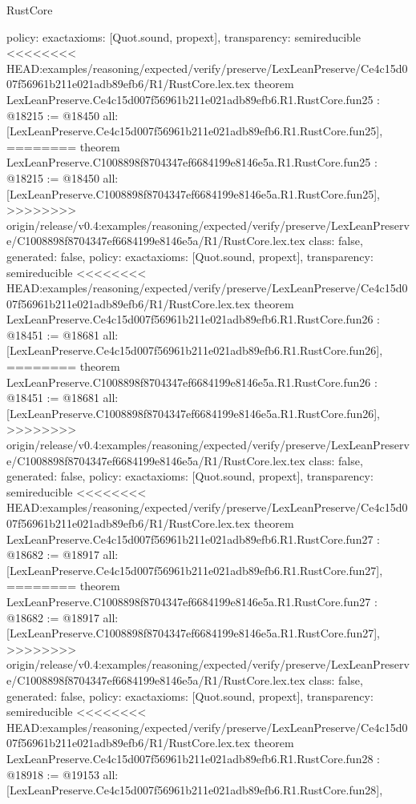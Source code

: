 \begin{lexlean}{RustCore}
\begin{coremodule}
{\begin{coremodule}
{{{{{{{{{{{{{{{{{{{{{{{{{{{{  policy: exact{axioms: [Quot.sound, propext]},
  transparency: semireducible
}
<<<<<<<< HEAD:examples/reasoning/expected/verify/preserve/LexLeanPreserve/Ce4c15d007f56961b211e021adb89efb6/R1/RustCore.lex.tex
theorem LexLeanPreserve.Ce4c15d007f56961b211e021adb89efb6.R1.RustCore.fun25 : @18215 := @18450 {
  all: [LexLeanPreserve.Ce4c15d007f56961b211e021adb89efb6.R1.RustCore.fun25],
========
theorem LexLeanPreserve.C1008898f8704347ef6684199e8146e5a.R1.RustCore.fun25 : @18215 := @18450 {
  all: [LexLeanPreserve.C1008898f8704347ef6684199e8146e5a.R1.RustCore.fun25],
>>>>>>>> origin/release/v0.4:examples/reasoning/expected/verify/preserve/LexLeanPreserve/C1008898f8704347ef6684199e8146e5a/R1/RustCore.lex.tex
  class: false,
  generated: false,
  policy: exact{axioms: [Quot.sound, propext]},
  transparency: semireducible
}
<<<<<<<< HEAD:examples/reasoning/expected/verify/preserve/LexLeanPreserve/Ce4c15d007f56961b211e021adb89efb6/R1/RustCore.lex.tex
theorem LexLeanPreserve.Ce4c15d007f56961b211e021adb89efb6.R1.RustCore.fun26 : @18451 := @18681 {
  all: [LexLeanPreserve.Ce4c15d007f56961b211e021adb89efb6.R1.RustCore.fun26],
========
theorem LexLeanPreserve.C1008898f8704347ef6684199e8146e5a.R1.RustCore.fun26 : @18451 := @18681 {
  all: [LexLeanPreserve.C1008898f8704347ef6684199e8146e5a.R1.RustCore.fun26],
>>>>>>>> origin/release/v0.4:examples/reasoning/expected/verify/preserve/LexLeanPreserve/C1008898f8704347ef6684199e8146e5a/R1/RustCore.lex.tex
  class: false,
  generated: false,
  policy: exact{axioms: [Quot.sound, propext]},
  transparency: semireducible
}
<<<<<<<< HEAD:examples/reasoning/expected/verify/preserve/LexLeanPreserve/Ce4c15d007f56961b211e021adb89efb6/R1/RustCore.lex.tex
theorem LexLeanPreserve.Ce4c15d007f56961b211e021adb89efb6.R1.RustCore.fun27 : @18682 := @18917 {
  all: [LexLeanPreserve.Ce4c15d007f56961b211e021adb89efb6.R1.RustCore.fun27],
========
theorem LexLeanPreserve.C1008898f8704347ef6684199e8146e5a.R1.RustCore.fun27 : @18682 := @18917 {
  all: [LexLeanPreserve.C1008898f8704347ef6684199e8146e5a.R1.RustCore.fun27],
>>>>>>>> origin/release/v0.4:examples/reasoning/expected/verify/preserve/LexLeanPreserve/C1008898f8704347ef6684199e8146e5a/R1/RustCore.lex.tex
  class: false,
  generated: false,
  policy: exact{axioms: [Quot.sound, propext]},
  transparency: semireducible
}
<<<<<<<< HEAD:examples/reasoning/expected/verify/preserve/LexLeanPreserve/Ce4c15d007f56961b211e021adb89efb6/R1/RustCore.lex.tex
theorem LexLeanPreserve.Ce4c15d007f56961b211e021adb89efb6.R1.RustCore.fun28 : @18918 := @19153 {
  all: [LexLeanPreserve.Ce4c15d007f56961b211e021adb89efb6.R1.RustCore.fun28],
}}}}}}}}}}}}}}}}}}}}}}}}}}}}}}}
\end{coremodule}}
\end{coremodule}
\end{lexlean}
